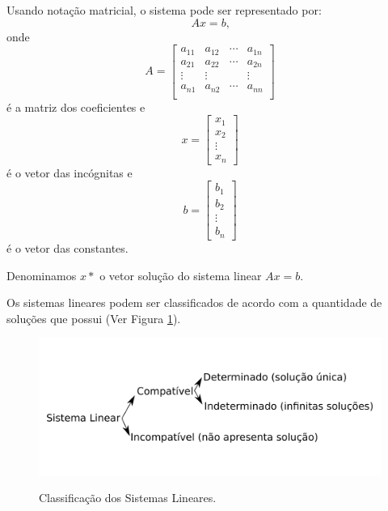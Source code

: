 \documentclass[
	12pt,				%
	openright,			%
	twoside,			%
	a4paper,			%
	english,			%
	french,				%
	brazil,				%
	sumario=tradicional
]{abntex2}
\numberwithin{example}{chapter}
\numberwithin{remark}{chapter}
\numberwithin{definition}{chapter}
\numberwithin{figure}{chapter}
\begin{document}
Usando notação matricial, o sistema pode ser representado por:
$$
    Ax=b
    \text{,}
$$
onde 
$$
    A=\begin{bmatrix}
        a_{11} & a_{12} & \cdots & a_{1n} \\ 
        a_{21} & a_{22} & \cdots & a_{2n} \\ 
        \vdots & \vdots &        & \vdots \\
        a_{n1} & a_{n2} & \cdots & a_{nn} \\ 
    \end{bmatrix}
$$
é a matriz dos coeficientes e
$$
    x=\begin{bmatrix}
        x_1\\
        x_2\\
        \vdots\\
        x_n
    \end{bmatrix}
$$
é o vetor das incógnitas e
$$
    b=\begin{bmatrix}
        b_1\\
        b_2\\
        \vdots\\
        b_n
    \end{bmatrix}
$$
é o vetor das constantes.

Denominamos $x*$ o vetor solução do sistema linear $Ax=b$.

Os sistemas lineares podem ser classificados de acordo com a quantidade de soluções que possui (Ver Figura \ref{fig:classificacao_sistemas_lineares}).

\newpage

\begin{figure}[h]
	\centering
	\caption{Classificação dos Sistemas Lineares.}
	\includegraphics[scale=0.5]{figuras/figura_003.png}
	\label{fig:classificacao_sistemas_lineares}
\end{figure}
\end{document}
